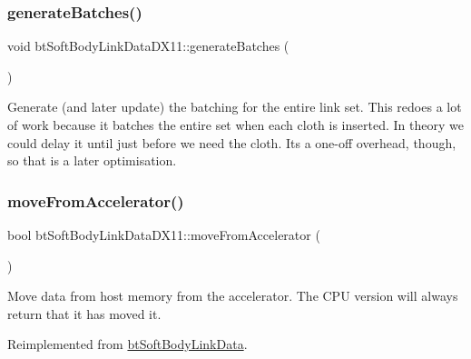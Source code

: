 \subsubsection{\texorpdfstring{generate\+Batches()}{generateBatches()}\hspace{0.1cm}{\footnotesize\ttfamily [2/2]}}
{\footnotesize\ttfamily void bt\+Soft\+Body\+Link\+Data\+D\+X11\+::generate\+Batches (\begin{DoxyParamCaption}{ }\end{DoxyParamCaption})}

Generate (and later update) the batching for the entire link set. This redoes a lot of work because it batches the entire set when each cloth is inserted. In theory we could delay it until just before we need the cloth. It\textquotesingle{}s a one-\/off overhead, though, so that is a later optimisation. \mbox{\label{classbtSoftBodyLinkDataDX11_aad757252b4538a6f8f6eca526335e71d}} 
\subsubsection{\texorpdfstring{move\+From\+Accelerator()}{moveFromAccelerator()}\hspace{0.1cm}{\footnotesize\ttfamily [1/2]}}
{\footnotesize\ttfamily bool bt\+Soft\+Body\+Link\+Data\+D\+X11\+::move\+From\+Accelerator (\begin{DoxyParamCaption}{ }\end{DoxyParamCaption})\hspace{0.3cm}{\ttfamily [virtual]}}

Move data from host memory from the accelerator. The C\+PU version will always return that it has moved it. 

Reimplemented from \hyperlink{classbtSoftBodyLinkData_a5018ad236aae590df94bca63c1ad7ee1}{bt\+Soft\+Body\+Link\+Data}.

\mbox{\label{classbtSoftBodyLinkDataDX11_a503f2df316127641cde3ab997b511735}} 
